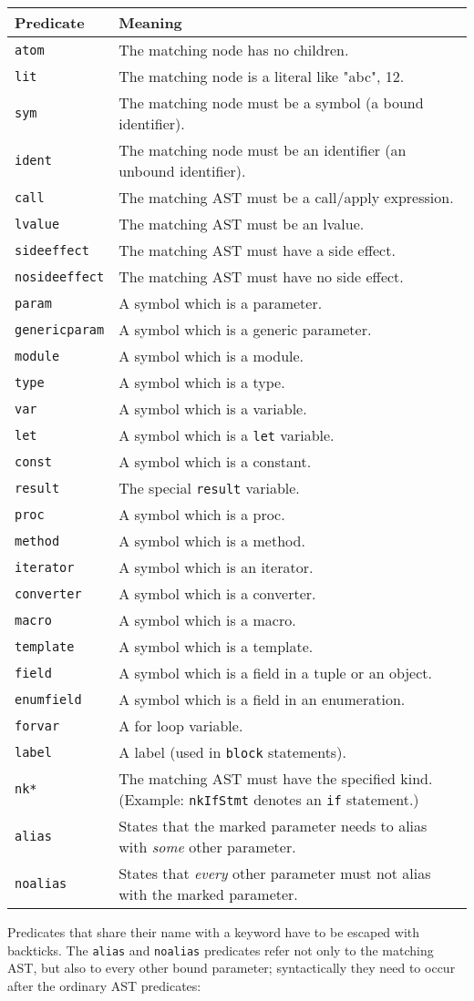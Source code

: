 \begin{longtable}[]{@{}ll@{}}
\toprule
Predicate & Meaning\tabularnewline
\midrule
\endhead
\texttt{atom} & The matching node has no children.\tabularnewline
\texttt{lit} & The matching node is a literal like "abc",
12.\tabularnewline
\texttt{sym} & The matching node must be a symbol (a bound
identifier).\tabularnewline
\texttt{ident} & The matching node must be an identifier (an unbound
identifier).\tabularnewline
\texttt{call} & The matching AST must be a call/apply
expression.\tabularnewline
\texttt{lvalue} & The matching AST must be an lvalue.\tabularnewline
\texttt{sideeffect} & The matching AST must have a side
effect.\tabularnewline
\texttt{nosideeffect} & The matching AST must have no side
effect.\tabularnewline
\texttt{param} & A symbol which is a parameter.\tabularnewline
\texttt{genericparam} & A symbol which is a generic
parameter.\tabularnewline
\texttt{module} & A symbol which is a module.\tabularnewline
\texttt{type} & A symbol which is a type.\tabularnewline
\texttt{var} & A symbol which is a variable.\tabularnewline
\texttt{let} & A symbol which is a \texttt{let} variable.\tabularnewline
\texttt{const} & A symbol which is a constant.\tabularnewline
\texttt{result} & The special \texttt{result} variable.\tabularnewline
\texttt{proc} & A symbol which is a proc.\tabularnewline
\texttt{method} & A symbol which is a method.\tabularnewline
\texttt{iterator} & A symbol which is an iterator.\tabularnewline
\texttt{converter} & A symbol which is a converter.\tabularnewline
\texttt{macro} & A symbol which is a macro.\tabularnewline
\texttt{template} & A symbol which is a template.\tabularnewline
\texttt{field} & A symbol which is a field in a tuple or an
object.\tabularnewline
\texttt{enumfield} & A symbol which is a field in an
enumeration.\tabularnewline
\texttt{forvar} & A for loop variable.\tabularnewline
\texttt{label} & A label (used in \texttt{block}
statements).\tabularnewline
\texttt{nk*} & The matching AST must have the specified kind. (Example:
\texttt{nkIfStmt} denotes an \texttt{if} statement.)\tabularnewline
\texttt{alias} & States that the marked parameter needs to alias with
\emph{some} other parameter.\tabularnewline
\texttt{noalias} & States that \emph{every} other parameter must not
alias with the marked parameter.\tabularnewline
\bottomrule
\end{longtable}

Predicates that share their name with a keyword have to be escaped with
backticks. The \texttt{alias} and \texttt{noalias} predicates refer not
only to the matching AST, but also to every other bound parameter;
syntactically they need to occur after the ordinary AST predicates:

